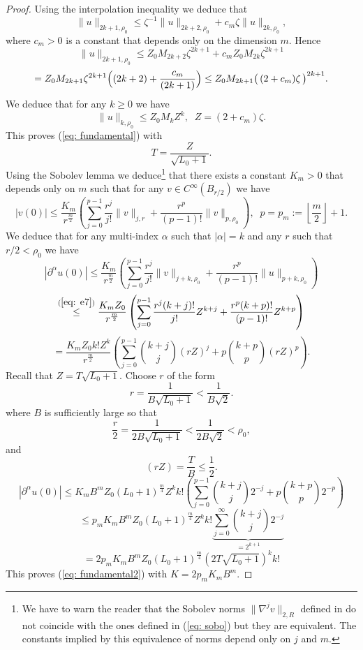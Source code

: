 \documentclass[reqno, 11pt]{amsart}
\theoremstyle{definition}
\numberwithin{equation}{section}
\begin{document}
\begin{proof}
 Using the interpolation inequality  \cite[Chap. 8,  Eq. (2.7)]{LM} we deduce that
 \[
 \|u\|_{2k+1,\rho_0} \leq \zeta^{-1}\|u\|_{2k+2,\rho_0} +c_m\zeta \|u\|_{2k,\rho_0},
 \]
 where $c_m>0$ is a constant that depends only on the dimension $m$. Hence
 \[
 \|u\|_{2k+1,\rho_0}\leq  Z_0 M_{2k+2} \zeta^{2k+1} +c_mZ_0 M_{2k}\zeta^{2k+1}
 \]
 \[
 =Z_0M_{2k+1}\zeta^{2k+1}\Bigl( (2k+2) +\frac{c_m}{(2k+1)}\Bigr)\leq Z_0M_{2k+1}\bigl(\,(2+c_m)\zeta\,\bigr)^{2k+1}.
 \]
 We deduce that for any $k\geq 0$ we have
 \begin{equation}
 \|u\|_{k,\rho_0} \leq Z_0 M_k  Z^k,\;\; Z= (2+c_m)\zeta.
 \label{eq: e7}
 \end{equation}
 This proves (\ref{eq: fundamental}) with 
 \[
T=\frac{Z}{\sqrt{L_0+1}}.
 \]
 Using the Sobolev lemma \cite[Thm. 3.5.1]{Mo}  we deduce\footnote{We have to warn the reader that    the Sobolev  norms  $\|\nabla^jv\|_{2, R}$ defined  in \cite{Mo} do not coincide with the ones defined in (\ref{eq: sobo}) but they are equivalent. The constants implied by this equivalence of norms depend only on $j$ and $m$.} that there exists a constant  $K_m>0$ that depends only on $m$  such that for any $v\in C^\infty(B_{r/2})$ we have 
 \[
 |v(0)| \leq\frac{K_m}{r^{\frac{m}{2}}}\left( \sum_{j=0}^{p-1}\frac{r^j}{j!}\|v\|_{j,r}+ \frac{r^p}{(p-1)!} \|v\|_{p,\rho_0}\right),\;\; p=p_m:=\left\lfloor \frac{m}{2}\right\rfloor +1.
 \]
 We deduce that for any multi-index $\alpha$ such that $|\alpha|=k$  and any $r$ such that $r/2<\rho_0$ we have
 \[
 |{\partial}^\alpha u(0)|\leq \frac{K_m}{r^{\frac{m}{2}}}\left( \sum_{j=0}^{p-1}\frac{r^j}{j!}\|v\|_{j+k,\rho_0}+ \frac{r^p}{(p-1)!} \|u\|_{p+k,\rho_0}\right)
 \]
 \[
 \stackrel{(\ref{eq: e7})}{\leq} \frac{K_m Z_0}{r^{\frac{m}{2}}} \left( \sum_{j=0}^{p-1}\frac{r^j(k+j)!}{j!}Z^{k+j}+ \frac{r^p (k+p)!}{(p-1)!} Z^{k+p}\right)
 \]
 \[
 = \frac{K_m Z_0 k! Z^k}{r^{\frac{m}{2}}}\left( \sum_{j=0}^{p-1}\binom{k+j}{j}(rZ)^{j}+ p\binom{k+p}{p} (rZ)^{p}\right).
 \]
 Recall that $Z=T\sqrt{L_0+1}$. Choose $r$ of the form
 \[
 r=\frac{1}{B\sqrt{L_0+1}} < \frac{1}{B\sqrt{2}}.
 \]
  where $B$ is sufficiently  large so that
  \[
  \frac{r}{2}=\frac{1}{2B\sqrt{L_0+1}} < \frac{1}{2B\sqrt{2}}<\rho_0,
  \]
  and 
 \[
 (rZ)=\frac{T}{B}\leq \frac{1}{2}.
 \]
  \[
 |{\partial}^\alpha u(0)|\leq  K_m B^m Z_0(L_0+1)^{\frac{m}{4}} Z^k k! \left( \sum_{j=0}^{p-1}\binom{k+j}{j}2^{-j}+ p\binom{k+p}{p} 2^{-p}\right)
 \]
 \[
 \leq p_mK_m B^m Z_0(L_0+1)^{\frac{m}{4}} Z^k k! \underbrace{\sum_{j=0}^\infty\binom{k+j}{j}2^{-j}}_{=2^{k+1}}
 \]
 \[
 =2 p_mK_m B^m Z_0(L_0+1)^{\frac{m}{4}}(2T\sqrt{L_0+1})^k k!
 \]
 This proves  (\ref{eq: fundamental2}) with $K= 2 p_mK_m B^m$.
 \end{proof}
 
\end{document}
